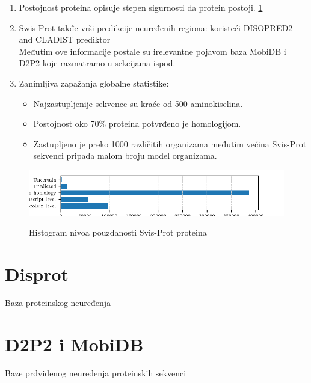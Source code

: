 \begin{enumerate}
  \item Postojnost proteina   opisuje stepen
    sigurnosti da protein postoji. \ref{fig:PE}

  \clearpage


  \item
    Swis-Prot takđe vrši predikcije neuređenih regiona:  koristeći DISOPRED2
    and CLADIST prediktor \parencite{meng_c2017}\\ Međutim ove informacije
    postale su irelevantne pojavom baza MobiDB i D2P2 koje razmatramo u
    sekcijama ispod.

  \item Zanimljiva zapažanja globalne statistike:
    \begin{itemize}
      \item Najzastupljenije sekvence su kraće od 500 aminokiselina.
      \item Postojnost oko 70\% proteina potvrđeno je homologijom.
      \item Zastupljeno je preko 1000 različitih organizama međutim
        većina Svis-Prot sekvenci pripada malom broju model organizama.
    \end{itemize}
      


\end{enumerate}

\begin{figure}[h!]
  \centering
  \includegraphics[]{plots/PE.pdf}
  \label{fig:PE}
  \caption{Histogram nivoa pouzdanosti Svis-Prot proteina}
\end{figure}

\section{Disprot}

Baza proteinskog neuređenja 

\section{D2P2 i MobiDB}

Baze prdviđenog neuređenja proteinskih sekvenci


